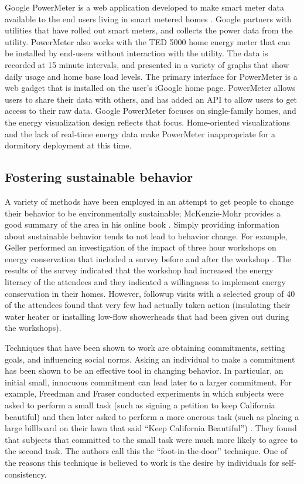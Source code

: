 Google PowerMeter is a web application developed to make smart meter data available to the end users living in smart metered homes \cite{Google-PowerMeter}. Google partners with utilities that have rolled out smart meters, and collects the power data from the utility. PowerMeter also works with the TED 5000 home energy meter that can be installed by end-users without interaction with the utility. The data is recorded at 15 minute intervals, and presented in a variety of graphs that show daily usage and home base load levels. The primary interface for PowerMeter is a web gadget that is installed on the user's iGoogle home page. PowerMeter allows users to share their data with others, and has added an API to allow users to get access to their raw data. Google PowerMeter focuses on single-family homes, and the energy visualization design reflects that focus. Home-oriented visualizations and the lack of real-time energy data make PowerMeter inappropriate for a dormitory deployment at this time.

\subsection{Fostering sustainable behavior}

A variety of methods have been employed in an attempt to get people to change their behavior to be environmentally sustainable; McKenzie-Mohr provides a good summary of the area in his online book \cite{McKenzie-Mohr2009}. Simply providing information about sustainable behavior tends to not lead to behavior change. For example, Geller performed an investigation of the impact of three hour workshops on energy conservation that included a survey before and after the workshop \cite{Geller81}. The results of the survey indicated that the workshop had increased the energy literacy of the attendees and they indicated a willingness to implement energy conservation in their homes. However, followup visits with a selected group of 40 of the attendees found that very few had actually taken action (insulating their water heater or installing low-flow showerheads that had been given out during the workshops).

Techniques that have been shown to work are obtaining commitments, setting goals, and influencing social norms. Asking an individual to make a commitment has been shown to be an effective tool in changing behavior. In particular, an initial small, innocuous commitment can lead later to a larger commitment. For example, Freedman and Fraser conducted experiments in which subjects were asked to perform a small task (such as signing a petition to keep California beautiful) and then later asked to perform a more onerous task (such as placing a large billboard on their lawn that said ``Keep California Beautiful'') \cite{Freedman66}. They found that subjects that committed to the small task were much more likely to agree to the second task. The authors call this the ``foot-in-the-door'' technique. One of the reasons this technique is believed to work is the desire by individuals for self-consistency.

